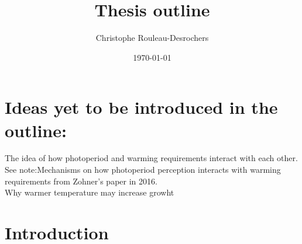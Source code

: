 \documentclass{article}
\title{Thesis outline}
\date{\today}
\author{Christophe Rouleau-Desrochers}
\begin{document}

\maketitle
\section *{Ideas yet to be introduced in the outline:}
The idea of how photoperiod and warming requirements interact with each other. See note:Mechanisms on how photoperiod perception interacts with warming requirements from Zohner's paper in 2016.\\
Why warmer temperature may increase growht


\section*{Introduction}

\end{document}
